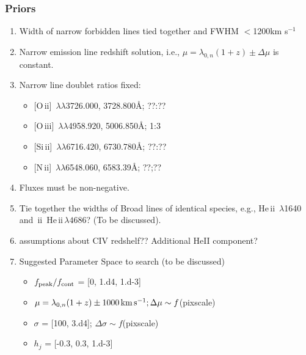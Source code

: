 \documentclass[12pt,letterpaper]{article}
\newcommand{\HeII}{\ifmmode {\rm He}\,{\sc ii}\,\lambda4686 \else 
	           He\,{\sc ii}\,$\lambda4686$\fi}
\newcommand{\heii}{He\,{\sc ii}}
\newcommand{\nii}{N\,{\sc ii}}
\newcommand{\oii}{O\,{\sc ii}}
\newcommand{\oiii}{O\,{\sc iii}}
\newcommand{\Sizw}{Si\,{\sc ii}}
\begin{document}
\subsubsection*{Priors}

  \begin{enumerate}
    \item Width of narrow forbidden lines tied together and FWHM $<$1200km s$^{-1}$
    \item Narrow emission line redshift solution, i.e., $\mu = \lambda_{0,n}(1+z)\pm \Delta \mu$ is constant.
    \item Narrow line doublet ratios fixed:
      \begin{itemize}
        \item {[\oii]\, $\lambda \lambda$3726.000, 3728.800\AA; ??:??}
        \item {[\oiii]\, $\lambda \lambda$4958.920, 5006.850\AA;  1:3}
        \item {[\Sizw]\, $\lambda \lambda$6716.420, 6730.780\AA; ??:??}
        \item {[\nii]\, $\lambda \lambda$6548.060, 6583.39\AA; ??;??}
      \end{itemize}
    \item Fluxes must be non-negative.
    \item Tie together the widths of Broad lines of identical species, e.g., \heii\, $\lambda$1640 and \HeII?  (To be discussed).
    \item assumptions about CIV redshelf?? Additional HeII component?
    \item Suggested Parameter Space to search (to be discussed)
      \begin{itemize}
        \item $f_{\rm peak}/f_{\rm cont}$ = [0, 1.d4, 1.d-3]
        \item $\mu = \lambda_{0,n}(1+z)\pm 1000\, {\rm km}\, {\rm s}^{-1}; \Delta \mu \sim f$(pixscale)
        \item $\sigma$ = [100, 3.d4]; $\Delta \sigma \sim f$(pixscale)
        \item $h_j$ = [-0.3, 0.3, 1.d-3]
      \end{itemize}

  \end{enumerate}





\end{document}
